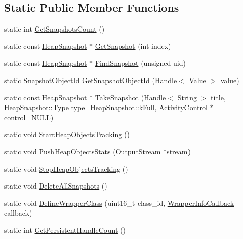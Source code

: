 \subsection*{Static Public Member Functions}
\begin{DoxyCompactItemize}
\item 
static int \hyperlink{classv8_1_1_heap_profiler_a739a665268bba6e640890464ccb60d26}{Get\+Snapshots\+Count} ()
\item 
static const \hyperlink{classv8_1_1_heap_snapshot}{Heap\+Snapshot} $\ast$ \hyperlink{classv8_1_1_heap_profiler_ad547f406908880cc7dc0453fe83cc216}{Get\+Snapshot} (int index)
\item 
static const \hyperlink{classv8_1_1_heap_snapshot}{Heap\+Snapshot} $\ast$ \hyperlink{classv8_1_1_heap_profiler_a1f77545176060f21239bd1a78e3967a7}{Find\+Snapshot} (unsigned uid)
\item 
static Snapshot\+Object\+Id \hyperlink{classv8_1_1_heap_profiler_ac15532477aaf5ad50ce569a240bf0dc8}{Get\+Snapshot\+Object\+Id} (\hyperlink{classv8_1_1_handle}{Handle}$<$ \hyperlink{classv8_1_1_value}{Value} $>$ value)
\item 
static const \hyperlink{classv8_1_1_heap_snapshot}{Heap\+Snapshot} $\ast$ \hyperlink{classv8_1_1_heap_profiler_a39e6df3b54335e183ca57edae1dc78e7}{Take\+Snapshot} (\hyperlink{classv8_1_1_handle}{Handle}$<$ \hyperlink{classv8_1_1_string}{String} $>$ title, Heap\+Snapshot\+::\+Type type=Heap\+Snapshot\+::k\+Full, \hyperlink{classv8_1_1_activity_control}{Activity\+Control} $\ast$control=N\+U\+L\+L)
\item 
static void \hyperlink{classv8_1_1_heap_profiler_a9f3073cb75f69c54b313ee5adfd1cbdc}{Start\+Heap\+Objects\+Tracking} ()
\item 
static void \hyperlink{classv8_1_1_heap_profiler_a77bf2e6bfc3b2fd23451ecded49515ac}{Push\+Heap\+Objects\+Stats} (\hyperlink{classv8_1_1_output_stream}{Output\+Stream} $\ast$stream)
\item 
static void \hyperlink{classv8_1_1_heap_profiler_a94d2c61cd403ca7caf1c366418db5776}{Stop\+Heap\+Objects\+Tracking} ()
\item 
static void \hyperlink{classv8_1_1_heap_profiler_af01cf79839c61b5cc6a92c422fd9875f}{Delete\+All\+Snapshots} ()
\item 
static void \hyperlink{classv8_1_1_heap_profiler_ae83d1fc891a24ecafdca44fca2dbe07a}{Define\+Wrapper\+Class} (uint16\+\_\+t class\+\_\+id, \hyperlink{classv8_1_1_heap_profiler_a696d8d6590879eeb5a4ad2814eafb599}{Wrapper\+Info\+Callback} callback)
\item 
static int \hyperlink{classv8_1_1_heap_profiler_a328b80376e88dd3dab7d5f3744c5fefd}{Get\+Persistent\+Handle\+Count} ()
\end{DoxyCompactItemize}
